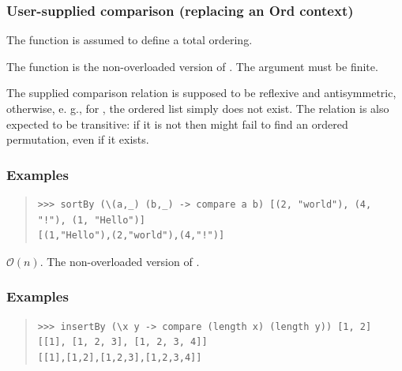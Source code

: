 \subsubsection{User-supplied comparison (replacing an Ord context)}
The function is assumed to define a total ordering.\par
\begin{haddockdesc}
\item[\begin{tabular}{@{}l}
sortBy :: (a -> a -> Ordering) -> {\char 91}a{\char 93} -> {\char 91}a{\char 93}
\end{tabular}]
{\haddockbegindoc
The  function is the non-overloaded version of .
 The argument must be finite.\par
The supplied comparison relation is supposed to be reflexive and antisymmetric,
 otherwise, e. g., for , the ordered list simply does not exist.
 The relation is also expected to be transitive: if it is not then 
 might fail to find an ordered permutation, even if it exists.\par
\subsubsection*{\textbf{Examples}}
\begin{quote}
{\haddockverb\begin{verbatim}
>>> sortBy (\(a,_) (b,_) -> compare a b) [(2, "world"), (4, "!"), (1, "Hello")]
[(1,"Hello"),(2,"world"),(4,"!")]

\end{verbatim}}
\end{quote}}
\end{haddockdesc}
\begin{haddockdesc}
\item[\begin{tabular}{@{}l}
insertBy :: (a -> a -> Ordering) -> a -> {\char 91}a{\char 93} -> {\char 91}a{\char 93}
\end{tabular}]
{\haddockbegindoc
\(\mathcal{O}(n)\). The non-overloaded version of .\par
\subsubsection*{\textbf{Examples}}
\begin{quote}
{\haddockverb\begin{verbatim}
>>> insertBy (\x y -> compare (length x) (length y)) [1, 2] [[1], [1, 2, 3], [1, 2, 3, 4]]
[[1],[1,2],[1,2,3],[1,2,3,4]]

\end{verbatim}}
\end{quote}}
\end{haddockdesc}
